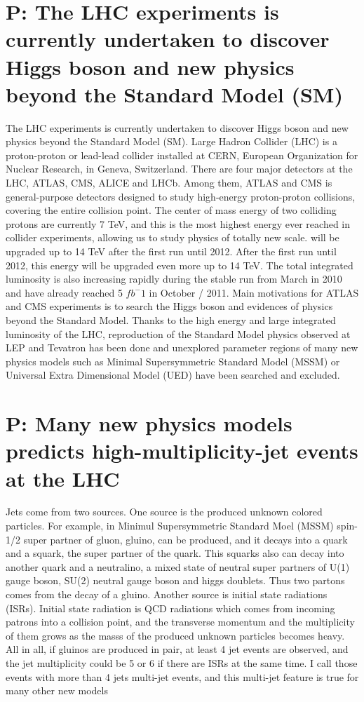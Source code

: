 \documentclass{book}
\begin{document}
\section{P: The LHC experiments is currently undertaken to discover Higgs boson and new physics beyond the Standard Model (SM)}
The LHC experiments is currently undertaken to discover Higgs boson and new physics beyond the Standard Model (SM). Large Hadron Collider (LHC) is a proton-proton or lead-lead collider installed at CERN, European Organization for Nuclear Research, in Geneva, Switzerland. There are four major detectors at the LHC, ATLAS, CMS, ALICE and LHCb. Among them, ATLAS and CMS is general-purpose detectors designed to study high-energy proton-proton collisions, covering the entire collision point. The center of mass energy of two colliding protons are currently 7 TeV, and this is the most highest energy ever reached in collider experiments, allowing us to study physics of totally new scale. will be upgraded up to 14 TeV after the first run until 2012.  After the first run until 2012, this energy will be upgraded even more up to 14 TeV. The total integrated luminosity is also increasing rapidly during the stable run from March in 2010 and have already reached 5 $ fb^-1$ in October / 2011. Main motivations for ATLAS and CMS experiments is to search the Higgs boson and evidences of physics beyond the Standard Model. Thanks to the high energy and large integrated luminosity of the LHC, reproduction of the Standard Model physics observed at LEP and Tevatron has been done and unexplored parameter regions of many new physics models such as Minimal Supersymmetric Standard Model (MSSM) or Universal Extra Dimensional Model (UED) have been searched and excluded.

\section{P: Many new physics models predicts high-multiplicity-jet events at the LHC}
Jets come from two sources. One source is the produced unknown colored particles. For example, in Minimul Supersymmetric Standard Moel (MSSM) spin-1/2 super partner of gluon, gluino, can be produced, and it decays into a quark and a squark, the super partner of the quark. This squarks also can decay into another quark and a neutralino, a mixed state of neutral super partners of U(1) gauge boson, SU(2) neutral gauge boson and higgs doublets. Thus two partons comes from the decay of a gluino. Another source is initial state radiations (ISRs). Initial state radiation is QCD radiations which comes from incoming patrons into a collision point, and the transverse momentum and the multiplicity of them grows as the masss of the produced unknown particles becomes heavy. All in all, if gluinos are produced in pair, at least 4 jet events are observed, and the jet multiplicity could be 5 or 6 if there are ISRs at the same time. I call those events with more than 4 jets multi-jet events, and this multi-jet feature is true for many other new models
\end{document}
